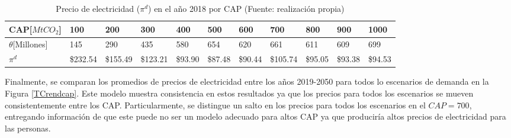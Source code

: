 \begin{table}[H]
\begin{footnotesize}
    \centering
    \begin{tabular}{|l|l|l|l|l|l|l|l|l|l|l|}
    \hline
        CAP[$MtCO_2$] & 100 & 200 & 300 & 400 & 500 & 600 & 700 & 800 & 900 & 1000 \\ \hline
       $\theta$[Millones]  & 145  & 290  & 435  & 580  & 654  & 620  & 661  & 611  & 609  & 699  \\ \hline
        $\pi^d$  &  \$232.54   &  \$155.49   &  \$123.21   &  \$93.90   &  \$87.48   &  \$90.44   &  \$105.74   &  \$95.05   &  \$93.38   &  \$94.53   \\ \hline
    \end{tabular}
    \caption{{\footnotesize Precio de electricidad ($\pi^d$) en el año 2018 por CAP (Fuente: realización propia)}}
    \label{TCpidporcap}
\end{footnotesize}
\end{table}


Finalmente, se comparan los promedios de precios de electricidad entre los años 2019-2050 para todos lo escenarios de demanda en la Figura \ref{TCrendcap}. Este modelo muestra consistencia en estos resultados ya que los precios para todos los escenarios se mueven consistentemente entre los CAP. Particularmente, se distingue un salto en los precios para todos los escenarios en el $CAP=700$, entregando información de que este puede no ser un modelo adecuado para altos CAP ya que produciría altos precios de electricidad para las personas. 

